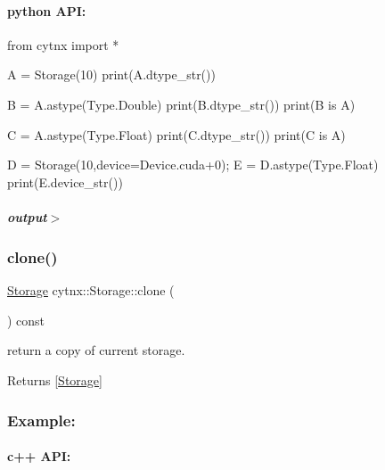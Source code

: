  \paragraph*{python A\+PI\+:}


\begin{DoxyCodeInclude}
\textcolor{keyword}{from} cytnx \textcolor{keyword}{import} *


A = Storage(10)
print(A.dtype\_str())

B = A.astype(Type.Double)
print(B.dtype\_str())
print(B \textcolor{keywordflow}{is} A)

C = A.astype(Type.Float)
print(C.dtype\_str())
print(C \textcolor{keywordflow}{is} A)

D = Storage(10,device=Device.cuda+0);
E = D.astype(Type.Float)
print(E.device\_str())

\end{DoxyCodeInclude}
 \subparagraph*{output$>$}


\begin{DoxyVerbInclude}
\end{DoxyVerbInclude}
 \mbox{\label{classcytnx_1_1Storage_aed0530dd20f3fb352d45653ba46a3d50}} 
\subsubsection{\texorpdfstring{clone()}{clone()}}
{\footnotesize\ttfamily \hyperlink{classcytnx_1_1Storage}{Storage} cytnx\+::\+Storage\+::clone (\begin{DoxyParamCaption}{ }\end{DoxyParamCaption}) const\hspace{0.3cm}{\ttfamily [inline]}}



return a copy of current storage. 

\begin{DoxyReturn}{Returns}
\mbox{[}\hyperlink{classcytnx_1_1Storage}{Storage}\mbox{]}
\end{DoxyReturn}
\subsubsection*{Example\+:}

\paragraph*{c++ A\+PI\+:}


